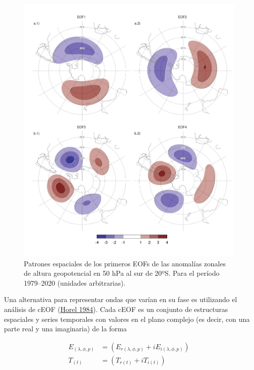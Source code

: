 \documentclass[12pt,oneside,a4paper]{reedthesis}
\begin{document}
\begin{figure}

{\centering \includegraphics{figures/20-ceofs/eof-naive-1} 

}

\caption{Patrones espaciales de los primeros EOFs de las anomalías zonales de altura geopotencial en 50 hPa al sur de 20ºS. Para el período 1979--2020 (unidades arbitrarias).}\label{fig:eof-naive}
\end{figure}

Una alternativa para representar ondas que varían en su fase es utilizando el análisis de cEOF (\protect\hyperlink{ref-horel1984}{Horel 1984}).
Cada cEOF es un conjunto de estructuras espaciales y series temporales con valores en el plano complejo (es decir, con una parte real y una imaginaria) de la forma

\begin{align}
E_{(\lambda, \phi, p)} &= (E_{r(\lambda, \phi, p)} +  iE_{i(\lambda, \phi, p)}) \\
T_{(t)} &= (T_{r(t)} +  iT_{i(t)})
\label{eq:ceof-equation}
\end{align}
\end{document}
